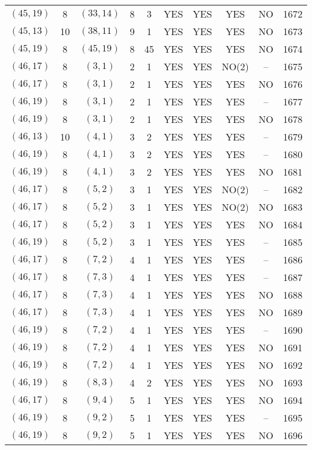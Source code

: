 \begin{longtable}{|c|c|c|c|c|c|c|c|c|c|}
$(45, 19)$ & 8 & $(33, 14)$ & 8 & 3 & YES & YES & YES & NO & 1672\\
$(45, 13)$ & 10 & $(38, 11)$ & 9 & 1 & YES & YES & YES & NO & 1673\\
$(45, 19)$ & 8 & $(45, 19)$ & 8 & 45 & YES & YES & YES & NO & 1674\\
$(46, 17)$ & 8 & $(3, 1)$ & 2 & 1 & YES & YES & NO(2) & -- & 1675\\
$(46, 17)$ & 8 & $(3, 1)$ & 2 & 1 & YES & YES & YES & NO & 1676\\
$(46, 19)$ & 8 & $(3, 1)$ & 2 & 1 & YES & YES & YES & -- & 1677\\
$(46, 19)$ & 8 & $(3, 1)$ & 2 & 1 & YES & YES & YES & NO & 1678\\
$(46, 13)$ & 10 & $(4, 1)$ & 3 & 2 & YES & YES & YES & -- & 1679\\
$(46, 19)$ & 8 & $(4, 1)$ & 3 & 2 & YES & YES & YES & -- & 1680\\
$(46, 19)$ & 8 & $(4, 1)$ & 3 & 2 & YES & YES & YES & NO & 1681\\
$(46, 17)$ & 8 & $(5, 2)$ & 3 & 1 & YES & YES & NO(2) & -- & 1682\\
$(46, 17)$ & 8 & $(5, 2)$ & 3 & 1 & YES & YES & NO(2) & NO & 1683\\
$(46, 17)$ & 8 & $(5, 2)$ & 3 & 1 & YES & YES & YES & NO & 1684\\
$(46, 19)$ & 8 & $(5, 2)$ & 3 & 1 & YES & YES & YES & -- & 1685\\
$(46, 17)$ & 8 & $(7, 2)$ & 4 & 1 & YES & YES & YES & -- & 1686\\
$(46, 17)$ & 8 & $(7, 3)$ & 4 & 1 & YES & YES & YES & -- & 1687\\
$(46, 17)$ & 8 & $(7, 3)$ & 4 & 1 & YES & YES & YES & NO & 1688\\
$(46, 17)$ & 8 & $(7, 3)$ & 4 & 1 & YES & YES & YES & NO & 1689\\
$(46, 19)$ & 8 & $(7, 2)$ & 4 & 1 & YES & YES & YES & -- & 1690\\
$(46, 19)$ & 8 & $(7, 2)$ & 4 & 1 & YES & YES & YES & NO & 1691\\
$(46, 19)$ & 8 & $(7, 2)$ & 4 & 1 & YES & YES & YES & NO & 1692\\
$(46, 19)$ & 8 & $(8, 3)$ & 4 & 2 & YES & YES & YES & NO & 1693\\
$(46, 17)$ & 8 & $(9, 4)$ & 5 & 1 & YES & YES & YES & NO & 1694\\
$(46, 19)$ & 8 & $(9, 2)$ & 5 & 1 & YES & YES & YES & -- & 1695\\
$(46, 19)$ & 8 & $(9, 2)$ & 5 & 1 & YES & YES & YES & NO & 1696\\

\end{longtable}
